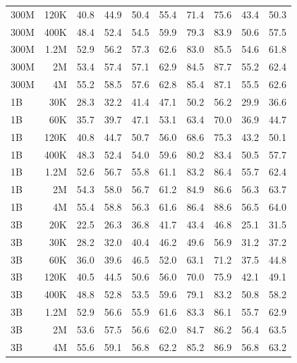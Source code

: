 \begin{table}[t]
\begin{tabulary}{1.0\textwidth}{l r c c c c c c c c}
300M  & 120K  & 40.8 & 44.9 & 50.4 & 55.4 & 71.4 & 75.6 & 43.4 & 50.3 \\
300M  & 400K  & 48.4 & 52.4 & 54.5 & 59.9 & 79.3 & 83.9 & 50.6 & 57.5 \\
300M  & 1.2M  & 52.9 & 56.2 & 57.3 & 62.6 & 83.0 & 85.5 & 54.6 & 61.8 \\
300M  & 2M    & 53.4 & 57.4 & 57.1 & 62.9 & 84.5 & 87.7 & 55.2 & 62.4 \\
300M  & 4M    & 55.2 & 58.5 & 57.6 & 62.8 & 85.4 & 87.1 & 55.5 & 62.6 \\
\midrule[0.25pt]
1B    & 30K   & 28.3 & 32.2 & 41.4 & 47.1 & 50.2 & 56.2 & 29.9 & 36.6 \\
1B    & 60K   & 35.7 & 39.7 & 47.1 & 53.1 & 63.4 & 70.0 & 36.9 & 44.7 \\
1B    & 120K  & 40.8 & 44.7 & 50.7 & 56.0 & 68.6 & 75.3 & 43.2 & 50.1 \\
1B    & 400K  & 48.3 & 52.4 & 54.0 & 59.6 & 80.2 & 83.4 & 50.5 & 57.7 \\
1B    & 1.2M  & 52.6 & 56.7 & 55.8 & 61.1 & 83.2 & 86.4 & 55.7 & 62.4 \\
1B    & 2M    & 54.3 & 58.0 & 56.7 & 61.2 & 84.9 & 86.6 & 56.3 & 63.7 \\
1B    & 4M    & 55.4 & 58.8 & 56.3 & 61.6 & 86.4 & 88.6 & 56.5 & 64.0 \\
\midrule[0.25pt]
3B    & 20K   & 22.5 & 26.3 & 36.8 & 41.7 & 43.4 & 46.8 & 25.1 & 31.5 \\
3B    & 30K   & 28.2 & 32.0 & 40.4 & 46.2 & 49.6 & 56.9 & 31.2 & 37.2 \\
3B    & 60K   & 36.0 & 39.6 & 46.5 & 52.0 & 63.1 & 71.2 & 37.5 & 44.8 \\
3B    & 120K  & 40.5 & 44.5 & 50.6 & 56.0 & 70.0 & 75.9 & 42.1 & 49.1 \\
3B    & 400K  & 48.8 & 52.8 & 53.5 & 59.6 & 79.1 & 83.2 & 50.8 & 58.2 \\
3B    & 1.2M  & 52.9 & 56.6 & 55.9 & 61.6 & 83.3 & 86.1 & 55.7 & 62.9 \\
3B    & 2M    & 53.6 & 57.5 & 56.6 & 62.0 & 84.7 & 86.2 & 56.4 & 63.5 \\
3B    & 4M    & 55.6 & 59.1 & 56.8 & 62.2 & 85.2 & 86.9 & 56.8 & 63.2 \\
    \bottomrule
  \end{tabulary}
\end{table}

